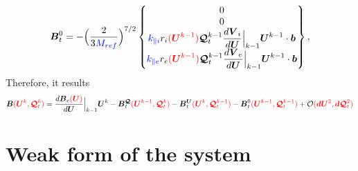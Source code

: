 \documentclass[a4paper,10pt]{article}
\newcommand{\bm}[1]{\text{\boldmath$#1$\unboldmath}}
\renewcommand{\b}{\bm{b}}
\newcommand{\DiscFunc}[1]{\bm{#1}}
\newcommand{\SecOrdTens}[1]{\bm{\mathcal{#1}}}
\renewcommand{\u}{\DiscFunc{U}}
\newcommand{\G}{\SecOrdTens{Q}}
\newcommand{\Gt}{\G_t}
\newcommand{\B}{\bm{B}}
\newcommand{\nd}[1]{{\color{blue} #1\color{black}}} %
\newcommand{\fo}[1]{{ \color{red} ( #1 )\color{black} }} %
\def\Mref{\nd{M_{ref}}}
\def\kpai{\nd{k_{\parallel i}}}
\def\kpae{\nd{k_{\parallel e}}}
\begin{document}
\begin{equation*}
 \B_t^0 = -\Big(\dfrac{2}{3 \Mref }\Big)^{7/2} \begin{Bmatrix}
                     0 \\
                     0 \\
                     \kpai  r_i\fo{\u^{k-1}}\Gt^{k-1}\dfrac{d\bm{V}_i}{d\u}\Big|_{k-1}\u^{k-1} \cdot \b\\
                     \kpae  r_e\fo{\u^{k-1}}\Gt^{k-1}\dfrac{d\bm{V}_e}{d\u}\Big|_{k-1}\u^{k-1} \cdot \b
       \end{Bmatrix}, 
\end{equation*}
Therefore, it results 
\begin{equation*}
 \B\fo{\u^k,\Gt^k}= \frac{d \B_c\fo{\u}}{d \u}\Big|_{k-1} \u^k -  \B_t^{\G} \fo{\u^{k-1},\Gt^k}- \B_t^{\u}\fo{\u^k,\Gt^{k-1}} - \B_t^0\fo{\u^{k-1},\Gt^{k-1}} +  \mathcal{O}\fo{\bm{dU}^2,\bm{d}\Gt^2}
\end{equation*}



\section{Weak form of the system}\label{sc:wf}
\end{document}
